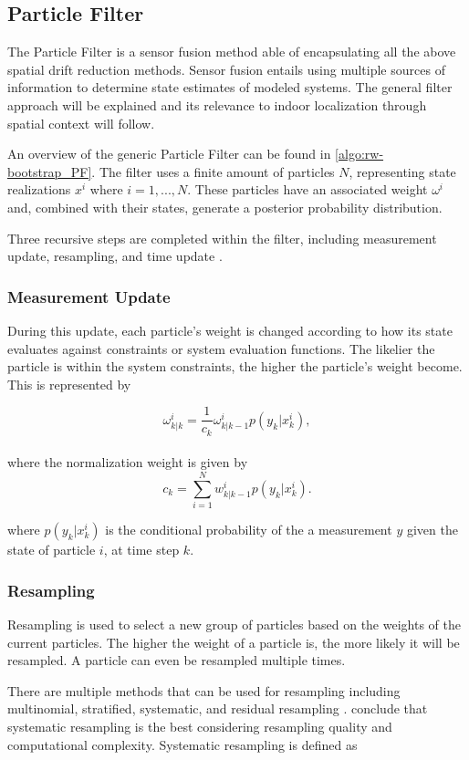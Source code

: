 \subsection{Particle Filter}
\label{sec:rw-pf}

The Particle Filter is a sensor fusion method able of encapsulating all the above spatial drift reduction methods. Sensor fusion entails using multiple sources of information to determine state estimates of modeled systems. The general filter approach will be explained and its relevance to indoor localization through spatial context will follow.\par
An overview of the generic Particle Filter can be found in \cref{algo:rw-bootstrap_PF}.  The filter uses a finite amount of particles $N$, representing state realizations $x^i$ where $i = 1,...,N$. These particles have an associated weight $\omega^i$ and, combined with their states, generate a posterior probability distribution. \par 
Three recursive steps are completed within the filter, including measurement update, resampling, and time update \cite{Wu2019,Woodman2008}.

\subsubsection{Measurement Update}
During this update, each particle's weight is changed according to how its state evaluates against constraints or system evaluation functions. The likelier the particle is within the system constraints, the higher the particle's weight become. This is represented by

\begin{equation}
	\omega^i_{k|k} = \frac{1}{c_k} \omega^i_{k|k-1} p(y_k|x^i_k),
\end{equation}\\
where the normalization weight is given by
\begin{equation}
	c_{k}=\sum_{i=1}^{N} w_{k | k-1}^{i} p\left(y_{k} | x_{k}^{i}\right).
	\label{eq:PF_probability density}
\end{equation}

where $p(y_k|x_k^i)$ is the conditional probability of the   a measurement $y$ given the state of particle $i$, at time step $k$.

\subsubsection{Resampling}
Resampling is used to select a new group of particles based on the weights of the current particles. The higher the weight of a particle is, the more likely it will be resampled. A particle can even be resampled multiple times. \par 
There are multiple methods that can be used for resampling including multinomial, stratified, systematic, and	residual resampling \cite{hol2006resampling,gustafsson2010statistical}. \citet{hol2006resampling} conclude that  systematic resampling is the best considering resampling quality and computational complexity. Systematic resampling is defined as 

